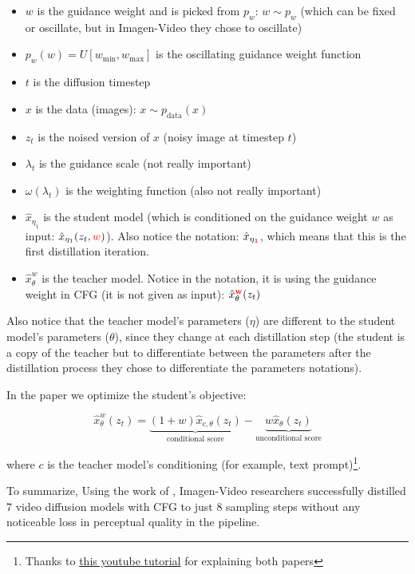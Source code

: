 \begin{itemize}
    \item $w$ is the guidance weight and is picked from $p_w$: $w \sim p_w$ (which can be fixed or oscillate, but in Imagen-Video they chose to oscillate)
    \item $p_w(w) = U[w_{\text{min}}, w_{\text{max}}]$ is the oscillating guidance weight function
    \item $t$ is the diffusion timestep
    \item $x$ is the data (images): $x \sim p_{\text{data}}(x)$
    \item $z_t$ is the noised version of $x$ (noisy image at timestep $t$)
    \item $\lambda_t$ is the guidance scale (not really important)
    \item $\omega(\lambda_t)$ is the weighting function (also not really important)
    \item $\hat{x}_{\eta_1}$ is the student model (which is conditioned on the guidance weight $w$ as input: $\hat{x}_{\eta_1}(z_t, \textcolor{red}{w})$). Also notice the notation: $\hat{x}_{\eta_\mathbf{\textcolor{red}{1}}}$, which means that this is the first distillation iteration.
    \item $\hat{x}_{\theta}^w$ is the teacher model. Notice in the notation, it is using the guidance weight in CFG (it is not given as input): $\hat{x}_{\theta}^\mathbf{\textcolor{red}{w}}(z_t)$
\end{itemize}

Also notice that the teacher model's parameters ($\eta$) are different to the student model's parameters ($\theta$), since they change at each distillation step (the student is a copy of the teacher but to differentiate between the parameters after the distillation process they chose to differentiate the parameters notations).

In the \cite{meng2023distillation} paper we optimize the student's objective:

\[  
    \hat{x}_{\theta}^w(z_t) = 
    \underbrace{(1+w) \hat{x}_{c,\theta} (z_t)}_{\text{conditional score}} - 
    \underbrace{w \hat{x}_\theta (z_t)}_{\text{unconditional score}}
\]

where $c$ is the teacher model's conditioning (for example, text prompt)\footnote{Thanks to \href{https://www.youtube.com/watch?v=ZXuK6IRJlnk}{this youtube tutorial} for explaining both papers}.

To summarize, Using the work of \cite{meng2023distillation}, Imagen-Video researchers successfully distilled 7 video diffusion models with CFG to just 8 sampling steps without any noticeable loss in perceptual quality in the pipeline.

















